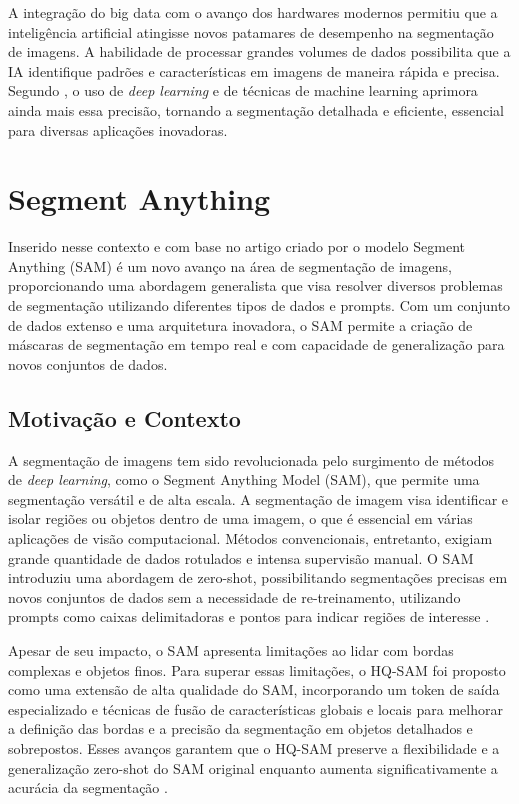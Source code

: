 A integração do big data com o avanço dos hardwares modernos permitiu que a inteligência artificial atingisse novos patamares de desempenho na segmentação de imagens. A habilidade de processar grandes volumes de dados possibilita que a IA identifique padrões e características em imagens de maneira rápida e precisa. Segundo , o uso de \textit{deep learning} e de técnicas de machine learning aprimora ainda mais essa precisão, tornando a segmentação detalhada e eficiente, essencial para diversas aplicações inovadoras.

\section{Segment Anything}

Inserido nesse contexto e com base no artigo criado por \cite{kirillov2023segany} o modelo Segment Anything (SAM) é um novo avanço na área de segmentação de imagens, proporcionando uma abordagem generalista que visa resolver diversos problemas de segmentação utilizando diferentes tipos de dados e prompts. Com um conjunto de dados extenso e uma arquitetura inovadora, o SAM permite a criação de máscaras de segmentação em tempo real e com capacidade de generalização para novos conjuntos de dados.

\subsection{Motivação e Contexto}

A segmentação de imagens tem sido revolucionada pelo surgimento de métodos de \textit{deep learning}, como o Segment Anything Model (SAM), que permite uma segmentação versátil e de alta escala. A segmentação de imagem visa identificar e isolar regiões ou objetos dentro de uma imagem, o que é essencial em várias aplicações de visão computacional. Métodos convencionais, entretanto, exigiam grande quantidade de dados rotulados e intensa supervisão manual. O SAM introduziu uma abordagem de zero-shot, possibilitando segmentações precisas em novos conjuntos de dados sem a necessidade de re-treinamento, utilizando prompts como caixas delimitadoras e pontos para indicar regiões de interesse \cite{ke2023segmenthighquality}.

Apesar de seu impacto, o SAM apresenta limitações ao lidar com bordas complexas e objetos finos. Para superar essas limitações, o HQ-SAM foi proposto como uma extensão de alta qualidade do SAM, incorporando um token de saída especializado e técnicas de fusão de características globais e locais para melhorar a definição das bordas e a precisão da segmentação em objetos detalhados e sobrepostos. Esses avanços garantem que o HQ-SAM preserve a flexibilidade e a generalização zero-shot do SAM original enquanto aumenta significativamente a acurácia da segmentação \cite{ke2023segmenthighquality}.

